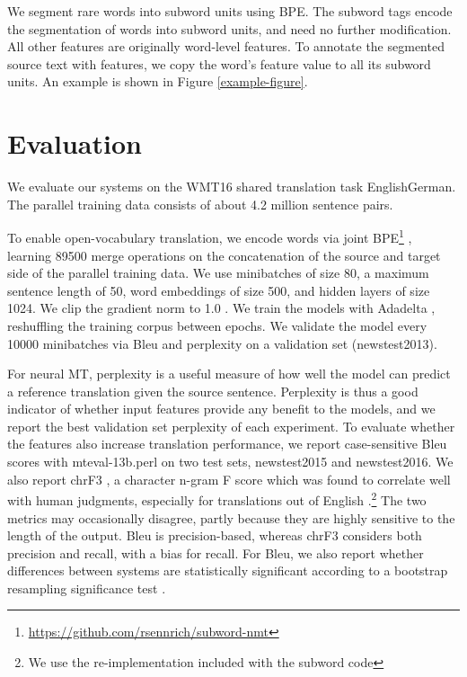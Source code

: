 \documentclass[11pt]{article}
\begin{document}
We segment rare words into subword units using BPE.
The subword tags encode the segmentation of words into subword units, and need no further modification.
All other features are originally word-level features.
To annotate the segmented source text with features, we copy the word's feature value to all its subword units.
An example is shown in Figure \ref{example-figure}.

\section{Evaluation}
\label{sec:eval}

We evaluate our systems on the WMT16 shared translation task EnglishGerman.
The parallel training data consists of about 4.2 million sentence pairs.

To enable open-vocabulary translation, we encode words via joint BPE\footnote{\url{https://github.com/rsennrich/subword-nmt}} \cite{DBLP:journals/corr/SennrichHB15}, learning \num{89500} merge operations on the concatenation of the source and target side of the parallel training data.
We use minibatches of size 80, a maximum sentence length of 50, word embeddings of size 500, and hidden layers of size 1024.
We clip the gradient norm to 1.0 \cite{DBLP:conf/icml/PascanuMB13}.
We train the models with Adadelta \cite{DBLP:journals/corr/abs-1212-5701}, reshuffling the training corpus between epochs.
We validate the model every \num{10000} minibatches via {\sc Bleu} and perplexity on a validation set (newstest2013).

For neural MT, perplexity is a useful measure of how well the model can predict a reference translation given the source sentence.
Perplexity is thus a good indicator of whether input features provide any benefit to the models, and we report the best validation set perplexity of each experiment.
To evaluate whether the features also increase translation performance,
we report case-sensitive {\sc Bleu} scores with mteval-13b.perl on two test sets, newstest2015 and newstest2016.
We also report {\sc chrF3} \cite{popovic:2015:WMT}, a character n-gram F score which was found to correlate well with human judgments, especially for translations out of English 
\cite{stanojevic-EtAl:2015:WMT}.\footnote{We use the re-implementation included with the subword code}
The two metrics may occasionally disagree, partly because they are highly sensitive to the length of the output.
{\sc Bleu} is precision-based, whereas {\sc chrF3} considers both precision and recall, with a bias for recall.
For {\sc Bleu}, we also report whether differences between systems are statistically significant according to a bootstrap resampling significance test \cite{riezler-maxwell:2005:MTSumm}.
\end{document}

